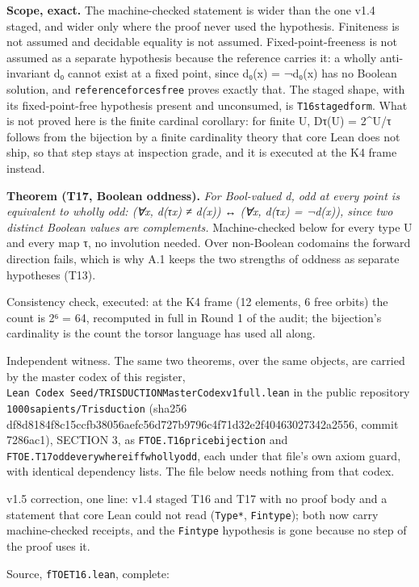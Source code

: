 \documentclass[10pt]{article}
\renewcommand{\_}{\origunderscore\allowbreak}
\begin{document}
\textbf{Scope, exact.} The machine-checked statement is wider than the
one v1.4 staged, and wider only where the proof never used the
hypothesis. Finiteness is not assumed and decidable equality is not
assumed. Fixed-point-freeness is not assumed as a separate hypothesis
because the reference carries it: a wholly anti-invariant d₀ cannot
exist at a fixed point, since d₀(x) = ¬d₀(x) has no Boolean solution,
and \texttt{reference\_forces\_free} proves exactly that. The staged
shape, with its fixed-point-free hypothesis present and unconsumed, is
\texttt{T16\_staged\_form}. What is not proved here is the finite
cardinal corollary: for finite U, \textbar Dτ(U)\textbar{} =
2\^{}\textbar U/τ\textbar{} follows from the bijection by a finite
cardinality theory that core Lean does not ship, so that step stays at
inspection grade, and it is executed at the K4 frame instead.

\textbf{Theorem (T17, Boolean oddness).} \emph{For Bool-valued d, odd at
every point is equivalent to wholly odd: (∀x, d(τx) ≠ d(x)) ↔ (∀x, d(τx)
= ¬d(x)), since two distinct Boolean values are complements.}
Machine-checked below for every type U and every map τ, no involution
needed. Over non-Boolean codomains the forward direction fails, which is
why A.1 keeps the two strengths of oddness as separate hypotheses (T13).

Consistency check, executed: at the K4 frame (12 elements, 6 free
orbits) the count is 2⁶ = 64, recomputed in full in Round 1 of the
audit; the bijection's cardinality is the count the torsor language has
used all along.

Independent witness. The same two theorems, over the same objects, are
carried by the master codex of this register,
\texttt{Lean\ Codex\ Seed/TRISDUCTION\_Master\_Codex\_v1\_1\_4\_full.lean}
in the public repository \texttt{1000sapients/Trisduction} (sha256
df8d8184f8c15ccfb38056aefc56d727b9796c4f71d32e2f40463027342a2556, commit
7286ac1), SECTION 3, as \texttt{FTOE.T16\_price\_bijection} and
\texttt{FTOE.T17\_odd\_everywhere\_iff\_wholly\_odd}, each under that
file's own axiom guard, with identical dependency lists. The file below
needs nothing from that codex.

v1.5 correction, one line: v1.4 staged T16 and T17 with no proof body
and a statement that core Lean could not read (\texttt{Type*},
\texttt{Fintype}); both now carry machine-checked receipts, and the
\texttt{Fintype} hypothesis is gone because no step of the proof uses
it.

Source, \texttt{fTOE\_T16.lean}, complete:
\end{document}
